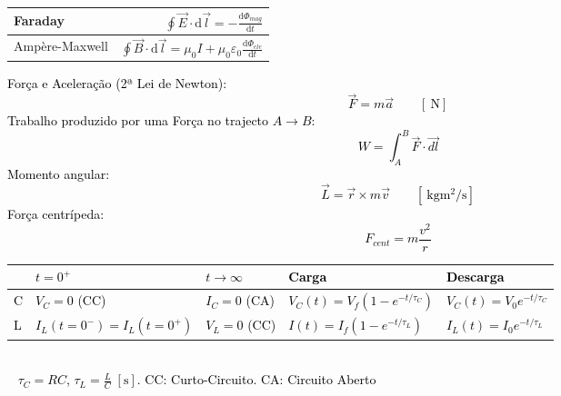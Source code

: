 \documentclass[a4paper,10pt]{extarticle} %
\newcommand{\mybox}[2]{
    \begin{tcolorbox}[colback=lightblue!5!white,colframe=lightblue!75!black,boxsep=1pt,arc=0pt,outer arc=0pt,title={\textcolor{black}{#1}}]
        \textcolor{black}{#2}
    \end{tcolorbox}
}
\begin{document}
\begin{multicols}{2}
{\begin{tabular}{||l|r||}
        \hline Faraday  & \( \oint \vec{E} \cdot  \mathrm{d}\vec{l}  = -\frac{\mathrm{d}\Phi_{mag}}{\mathrm{d} t} \)\\
        \hline Ampère-Maxwell  & \( \oint \vec{B} \cdot  \mathrm{d}\vec{l}  = \mu_0 I +\mu_0 \varepsilon_0\frac{\mathrm{d}\Phi_{ele}}{\mathrm{d} t} \)\\
        \hline
    \end{tabular} 
}
\mybox{Dinâmica}{
    Força e Aceleração (2ª Lei de Newton):
    \begin{equation*}
        \vec{F}= m \vec{a} \qquad [\SI{}{\newton}]
    \end{equation*}
    Trabalho produzido por uma Força no trajecto \( A \to B\):
    \begin{equation*}
        W = \int_A^B \vec{F} \cdot  \vec{dl}
    \end{equation*}
    Momento angular:
    \begin{equation*}
        \vec{L} =  \vec{r} \times m \vec{v} \qquad [\SI{}{\kilogram\meter\squared\per\second}]
    \end{equation*}
    Força centrípeda:
    \begin{equation*}
        F_{cent} =  m \frac{v^2}{r} 
    \end{equation*}
}

\end{multicols}
\mybox{Circuitos em Corrente Contínua (DC)}{
    \begin{tabular}{||l|l|l|l|l||}
        \hline   &{\bf $t=0^+$} &{\bf $t\to\infty$} &{\bf Carga} &{\bf Descarga}\\
        \hline C  & $V_C = 0$ (CC) & $I_C =0 $ (CA) &$V_C(t) = V_{f} (1-e^{-t/\tau_C}) $ &$V_C(t) = V_{0} e^{-t/\tau_C}$\\ 
        \hline L  & $I_L(t=0^-) = I_L(t=0^+)$ & $V_L =0 $ (CC)  &$I(t) = I_{f} (1-e^{-t/\tau_L})$ &$I_L(t) = I_{0} e^{-t/\tau_L}$\\ 
        \hline
    \end{tabular}
    \\~
    $\tau_C = RC$, $\tau_L = \frac{L}{C} \; [\mathrm{s}]$. CC: Curto-Circuito. CA: Circuito Aberto
}

\end{document}
